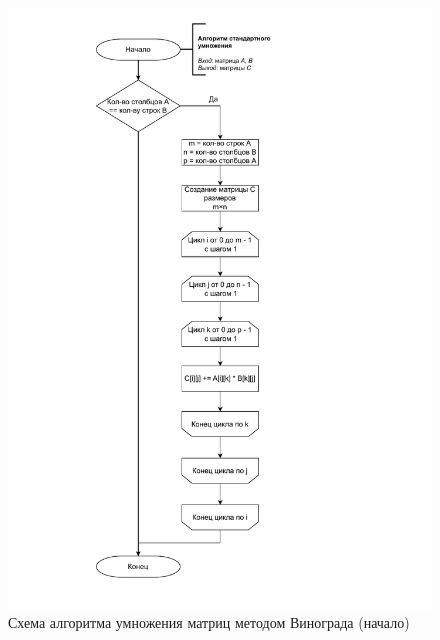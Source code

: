 \begin{figure}[h]
	\centering
	\includegraphics[height=0.9\textheight, page=2]{img/algorithms.pdf}
	\caption{Схема алгоритма умножения матриц методом Винограда (начало)}
	\label{fig:Vinograd1}
\end{figure}

\clearpage

